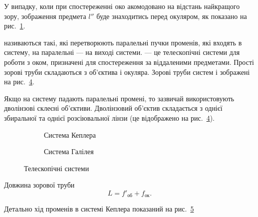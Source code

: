 У випадку, коли при спостереженні око акомодовано на відстань
найкращого зору, зображення предмета $l''$ буде знаходитись перед
окуляром, як показано на рис.~\ref{pic:microscope2}.

\begin{figure}[h!]\centering
	
	\caption{}
	\label{pic:microscope2}
\end{figure}

 називаються такі, які перетворюють
паралельні пучки променів, які входять в систему, на паралельні --- на
виході системи.  --- це телескопічні системи для роботи з оком, призначені для спостереження за віддаленими предметами.  Прості зорові труби складаються з об’єктива і окуляра. Зорові труби систем  і  зображені на рис.~\ref{pic:Telescopes}.

Якщо на систему падають паралельні промені, то зазвичай використовують дволінзові склеєні об'єктиви. Дволінзовий об'єктив складається з однієї збиральної та однієї розсіювальної лінзи (це відображено на рис.~\ref{pic:Telescopes}).

\begin{figure}[h!]\centering
	\begin{subfigure}{0.45\linewidth}\centering
		
		\caption{Система Кеплера}
		\label{pic:Kepler}
	\end{subfigure}
	\begin{subfigure}{0.45\linewidth}\centering
		
		\caption{Система Галілея}
		\label{pic:Gallileo}
	\end{subfigure}
	\caption{Телескопічні системи}
	\label{pic:Telescopes}
\end{figure}

Довжина зорової труби
\begin{equation}
	L = f'_\text{об} + f_\text{ок}.
\end{equation}

Детально хід променів в системі Кеплера показаний на рис.~\ref{pic:Kepler_rays}

\begin{figure}[h!]\centering
	
	\label{pic:Kepler_rays}
\end{figure}

